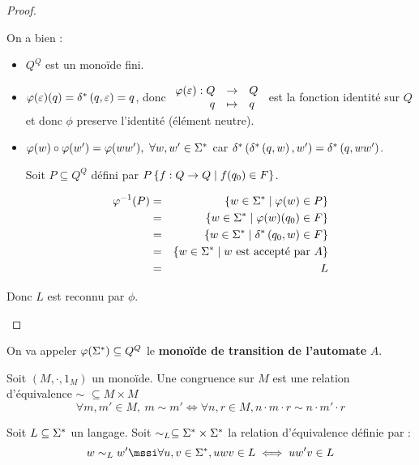 \begin{proof}
\begin{itemize}
		      On a bien :
		      \begin{itemize}
			      \item $Q^Q$ est un monoïde fini.
			      \item $\varphi (\varepsilon) (q) = \delta^{*} \left(q,\varepsilon\right) = q$, donc $\begin{array}{rcl}
					            \varphi (\varepsilon) : Q & \to     & Q \\
					            q                   & \mapsto & q
				            \end{array} $
			            est la fonction identité sur $Q$ et donc $\phi$ preserve l'identité (élément neutre).
			      \item $\varphi (w) \circ \varphi (w') = \varphi (ww'), \ \forall w, w' \in \Sigma^{*}$ car
			            $\delta^{*} \left(\delta^{*} \left(q,w\right),w'\right) = \delta^{*} \left(q,ww'\right)$.

			            Soit $P \subseteq Q^Q$ défini par $P \left\{f : Q \to Q \mid f(q_0)\in F\right\}$.

			            \begin{eqnarray*}
				            \varphi^{-1} (P) &=& \left\{w \in \Sigma^{*} \mid \varphi (w) \in P\right\} \\
				            &=& \left\{w \in \Sigma^{*} \mid \varphi (w) (q_0)\in F\right\} \\
				            &=& \left\{w \in \Sigma^{*} \mid \delta^{*} \left(q_0,w\right) \in F\right\}\\
				            &=& \left\{w \in \Sigma^{*} \mid w \text { est accepté par } A\right\}\\
				            &=& L
			            \end{eqnarray*}
		      \end{itemize}

		      Donc $L$ est reconnu par $\phi$.
	\end{itemize}
\end{proof}

\begin{definition}
	On va appeler $\varphi (\Sigma^{*})\subseteq Q^Q$ le \textbf{monoïde de transition de l'automate} $A$.
\end{definition}


\begin{definition}[Congruence]
	Soit $(M, \cdot, 1_M)$ un monoïde. Une congruence sur $M$ est une relation d'équivalence $\sim$ $\subseteq M \times M$ \tlq
	$$\forall m,m'\in M, \ m \sim m' \iff \forall n,r \in M, n\cdot m \cdot r \sim n \cdot m' \cdot r$$
\end{definition}

\begin{definition}
	Soit $L \subseteq \Sigma^{*}$ un langage. Soit $\sim_L \subseteq \Sigma^{*} \times \Sigma^{*}$ la relation d'équivalence définie par :
	$$ w \sim_L w' \mssi \forall u,v \in \mots, uwv \in L \iff u w' v \in L$$
\end{definition}

